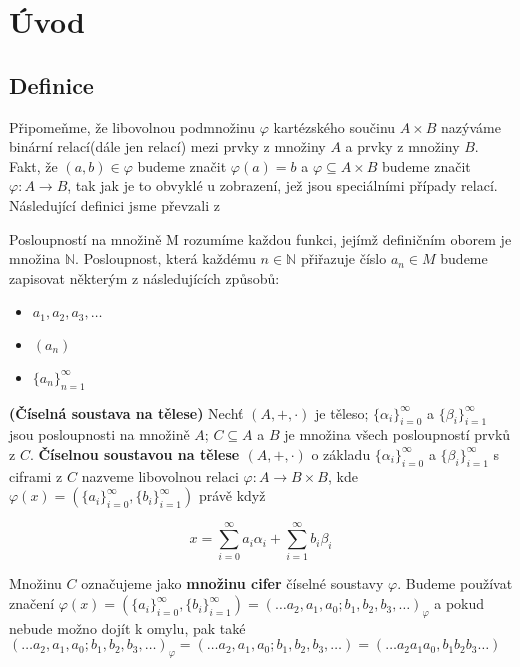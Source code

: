 \documentclass[czech,bachelor,dept470,male]{diploma}
\newcommand{\poslbeta}{\{\beta_i\}_{i=1}^{\infty}}
\newcommand{\poslalpha}{\{\alpha_i\}_{i=0}^{\infty}}
\begin{document}
	
\MakeTitlePages


\section{Úvod}
\subsection{Definice}

Připomeňme, že libovolnou podmnožinu $\varphi$ kartézského součinu $A \times B$ nazýváme binární relací(dále jen relací) mezi prvky z množiny $A$ a prvky z množiny $B$. Fakt, že $(a,b)\in \varphi$ budeme značit $\varphi(a) = b$ a $\varphi \subseteq A \times B$ budeme značit $\varphi : A \rightarrow B$, tak jak je to obvyklé u zobrazení, jež jsou speciálními případy relací.\newline\newline
Následující definici jsme převzali z \cite{aa}
\begin{definition}
	Posloupností na množině M rozumíme každou funkci, jejímž definičním oborem je množina $\mathbb{N}$. Posloupnost, která každému $n \in \mathbb{N}$ přiřazuje číslo $a_n \in M$ budeme zapisovat některým z následujících způsobů:
	\begin{itemize}
		\item $a_1, a_2, a_3,\dots$
		\item $(a_n)$
		\item $\{a_n\}_{n=1}^{\infty}$
	\end{itemize}
\end{definition}

\begin{definition}\label{d2} \textbf{(Číselná soustava na tělese)}
	Nechť $(A,+,\cdot)$ je těleso; $\poslalpha$ a $\poslbeta$ jsou posloupnosti na množině $A$; $C\subseteq A$ a $B$ je množina všech posloupností prvků z $C$.
	\textbf{Číselnou soustavou na tělese $(A,+,\cdot)$} o základu $\poslalpha$ a $\poslbeta$ s ciframi z $C$ nazveme libovolnou relaci $\varphi : A \rightarrow B\times B$, kde 	$\varphi(x)=\left(\{a_{i}\}_{i=0}^{\infty},\{b_{i}\}_{i=1}^{\infty}\right)$ právě když
	
	$$x = \sum_{i=0}^{\infty} a_{i}\alpha_{i} + \sum_{i=1}^{\infty} b_{i}\beta_{i}$$
	
	Množinu $C$ označujeme jako \textbf{množinu cifer} číselné soustavy $\varphi$. Budeme používat značení $\varphi(x) = \left(\{a_{i}\}_{i=0}^{\infty},\{b_{i}\}_{i=1}^{\infty}\right) = (\dots a_2,a_1,a_0;b_1, b_2, b_3, \dots)_{\varphi}$ a pokud nebude možno dojít k omylu, pak také $(\dots a_2,a_1,a_0;b_1, b_2, b_3, \dots)_{\varphi} = (\dots a_2,a_1,a_0;b_1, b_2, b_3, \dots) = (\dots a_2a_1a_0,b_1 b_2 b_3 \dots)$
\end{definition}
\end{document}
